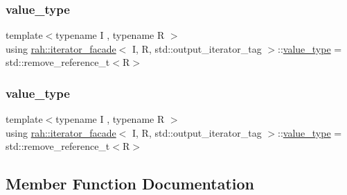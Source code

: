 \subsubsection{\texorpdfstring{value\_type}{value\_type}\hspace{0.1cm}{\footnotesize\ttfamily [1/2]}}
{\footnotesize\ttfamily template$<$typename I , typename R $>$ \\
using \mbox{\hyperlink{structrah_1_1iterator__facade}{rah\+::iterator\+\_\+facade}}$<$ I, R, std\+::output\+\_\+iterator\+\_\+tag $>$\+::\mbox{\hyperlink{structrah_1_1iterator__facade_3_01_i_00_01_r_00_01std_1_1output__iterator__tag_01_4_aeafcf4359545a589d72a23f8500e9b74}{value\+\_\+type}} =  std\+::remove\+\_\+reference\+\_\+t$<$R$>$}

\mbox{\label{structrah_1_1iterator__facade_3_01_i_00_01_r_00_01std_1_1output__iterator__tag_01_4_aeafcf4359545a589d72a23f8500e9b74}} 
\subsubsection{\texorpdfstring{value\_type}{value\_type}\hspace{0.1cm}{\footnotesize\ttfamily [2/2]}}
{\footnotesize\ttfamily template$<$typename I , typename R $>$ \\
using \mbox{\hyperlink{structrah_1_1iterator__facade}{rah\+::iterator\+\_\+facade}}$<$ I, R, std\+::output\+\_\+iterator\+\_\+tag $>$\+::\mbox{\hyperlink{structrah_1_1iterator__facade_3_01_i_00_01_r_00_01std_1_1output__iterator__tag_01_4_aeafcf4359545a589d72a23f8500e9b74}{value\+\_\+type}} =  std\+::remove\+\_\+reference\+\_\+t$<$R$>$}



\subsection{Member Function Documentation}
\mbox{\label{structrah_1_1iterator__facade_3_01_i_00_01_r_00_01std_1_1output__iterator__tag_01_4_a7c68323dc18e20b6f946223ee54d88c8}} 
